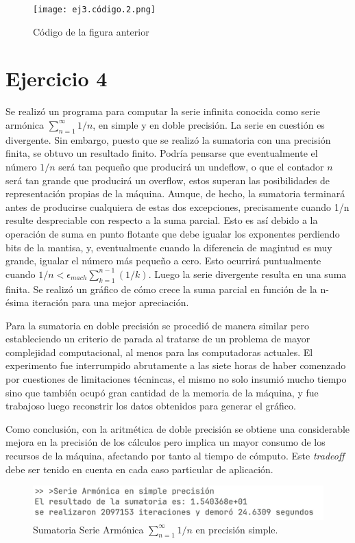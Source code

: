 \documentclass{article}
\begin{document}
\begin{figure}[H]
    \centering
    \texttt{[image: ej3.código.2.png]}
    \caption{Código de la figura anterior}
    \label{fig:enter-label}
\end{figure}

\section{Ejercicio 4}
Se realizó un programa para computar la serie infinita conocida como serie armónica $\sum_{n=1}^{\infty}1/n$, en simple y en doble precisión. La serie en cuestión es divergente. Sin embargo, puesto que se realizó la sumatoria con una precisión finita, se obtuvo un resultado finito. Podría pensarse que eventualmente el número $1/n$ será tan pequeño que producirá un undeflow, o que el contador $n$ será tan grande que producirá un overflow, estos superan las posibilidades de representación propias de la máquina. Aunque, de hecho, la sumatoria terminará antes de producirse cualquiera de estas dos excepciones, precisamente cuando 1/n resulte despreciable con respecto a la suma parcial. Esto es así debido a la operación de suma en punto flotante que debe igualar los exponentes perdiendo bits de la mantisa, y, eventualmente cuando la diferencia de magintud es muy grande, igualar el número más pequeño a cero. Esto ocurrirá puntualmente cuando $1/n < \epsilon_{mach}\sum_{k=1}^{n-1}(1/k)$. Luego la serie divergente resulta en una suma finita. Se realizó un gráfico de cómo crece la suma parcial en función de la n-ésima iteración para una mejor apreciación.

Para la sumatoria en doble precisión se procedió de manera similar pero estableciendo un criterio de parada al tratarse de un problema de mayor complejidad computacional, al menos para las computadoras actuales. El experimento fue interrumpido abrutamente a las siete horas de haber comenzado por cuestiones de limitaciones técnincas, el mismo no solo insumió mucho tiempo sino que también ocupó gran cantidad de la memoria de la máquina, y fue trabajoso luego reconstrir los datos obtenidos para generar el gráfico. 

Como conclusión, con la aritmética de doble precisión se obtiene una considerable mejora en la precisión de los cálculos pero implica un mayor consumo de los recursos de la máquina, afectando por tanto al tiempo de cómputo. Este \textit{tradeoff} debe ser tenido en cuenta en cada caso particular de aplicación.

\begin{figure}[H]
    \centering
    \includegraphics[width=1\linewidth]{ej4.resultado.1.png}
    \caption{Sumatoria Serie Armónica $\sum_{n=1}^{\infty}1/n$ en precisión simple.}
    \label{fig:enter-label}
\end{figure}
\end{document}
